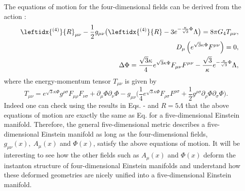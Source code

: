 \documentclass[12pt,epsf]{article}
\begin{document}
The equations of motion for the four-dimensional fields can be derived from the action :
\begin{eqnarray} \label{4eom-e}
&& \leftidx{^{(4)}}{R}_{\mu\nu} - \frac{1}{2} g_{\mu\nu} \big( \leftidx{^{(4)}}{R}
- 3 e^{- \frac{\kappa}{\sqrt{3}} \Phi} \Lambda \big)
= 8\pi G_4 T_{\mu\nu}, \\
\label{4eom-m}
&&  D_\mu \left( e^{\sqrt{3} \kappa \Phi} F^{\mu\nu} \right) = 0, \\
\label{4eom-s}
&&  \Delta \Phi = \frac{\sqrt{3}\kappa}{4} e^{\sqrt{3} \kappa \Phi} F_{\mu\nu} F^{\mu\nu}
- \frac{\sqrt{3}}{\kappa} e^{- \frac{\kappa}{\sqrt{3}} \Phi} \Lambda,
\end{eqnarray}
where the energy-momentum tensor $T_{\mu\nu}$ is given by
\begin{equation}\label{em-tensor}
 T_{\mu\nu} = e^{\sqrt{3} \kappa \Phi} g^{\rho\sigma}  F_{\mu\rho} F_{\nu\sigma}
 + \partial_\mu \Phi \partial_\nu \Phi
 - g_{\mu\nu} \Big( \frac{1}{4} e^{\sqrt{3} \kappa \Phi} F_{\rho\sigma} F^{\rho\sigma}
  + \frac{1}{2} g^{\rho\sigma} \partial_\rho \Phi \partial_\sigma \Phi \Big).
\end{equation}
Indeed one can check using the results in Eqs. - and $R = 5\Lambda$ that
the above equations of motion are exactly the same as Eq.  for a five-dimensional Einstein manifold.
Therefore, the general five-dimensional metric  describes a five-dimensional Einstein manifold
as long as the four-dimensional fields, $g_{\mu\nu} (x), \; A_\mu (x)$ and $\Phi(x)$,
satisfy the above equations of motion. It will be interesting to see how the other fields such as
$A_\mu (x)$ and $\Phi(x)$ deform the instanton structure of four-dimensional Einstein manifolds and
understand how these deformed geometries are nicely unified into a five-dimensional Einstein manifold.
\end{document}

